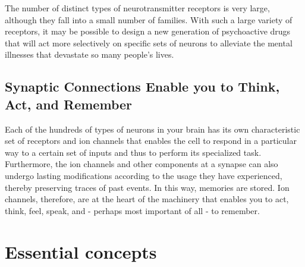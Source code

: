 The number of distinct types of neurotransmitter receptors is very large,
although they fall into a small number of families. With such a large variety of receptors, it
may be possible to design a new generation of psychoactive drugs that
will act more selectively on specific sets of neurons to alleviate the mental
illnesses that devastate so many people’s lives.

\subsection{Synaptic Connections Enable you to Think, Act, and Remember}

Each of the hundreds of types of neurons in your brain has its own characteristic set
of receptors and ion channels that enables the cell to respond in a particular
way to a certain set of inputs and thus to perform its specialized
task. Furthermore, the ion channels and other components at a synapse
can also undergo lasting modifications according to the usage they have
experienced, thereby preserving traces of past events. In this way, memories
are stored. Ion channels, therefore, are at the heart of the machinery
that enables you to act, think, feel, speak, and - perhaps most important
of all - to remember.

\section{Essential concepts}

